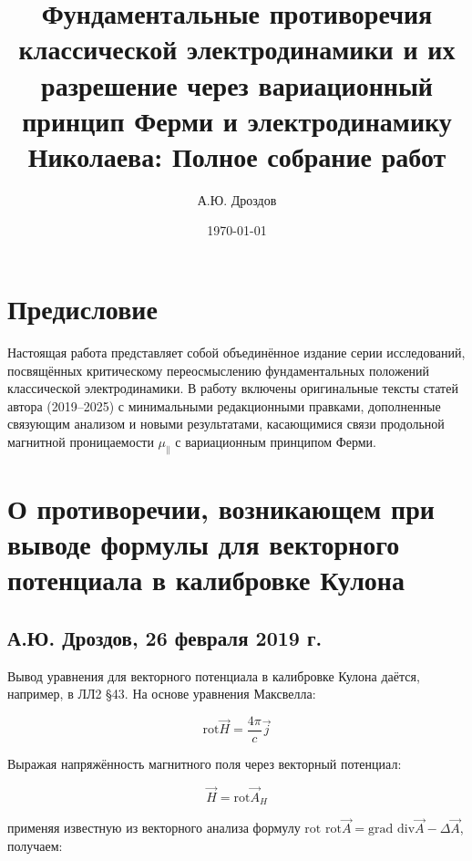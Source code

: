 \documentclass[12pt, a4paper]{article}
\title{Фундаментальные противоречия классической электродинамики и их разрешение через вариационный принцип Ферми и электродинамику Николаева: Полное собрание работ}
\author{А.Ю. Дроздов}
\date{\today}
\begin{document}
\maketitle

\tableofcontents
\newpage

\section*{Предисловие}

Настоящая работа представляет собой объединённое издание серии исследований, посвящённых критическому переосмыслению фундаментальных положений классической электродинамики. В работу включены оригинальные тексты статей автора (2019--2025) с минимальными редакционными правками, дополненные связующим анализом и новыми результатами, касающимися связи продольной магнитной проницаемости $\mu_{\parallel}$ с вариационным принципом Ферми.

\newpage

\section{О противоречии, возникающем при выводе формулы для векторного потенциала в калибровке Кулона}
\label{sec:work01}

\subsection*{А.Ю. Дроздов, 26 февраля 2019 г.}

Вывод уравнения для векторного потенциала в калибровке Кулона даётся, например, в ЛЛ2 §43. На основе уравнения Максвелла:

\begin{equation}
\text{rot} \vec{H} = \frac{4\pi}{c} \vec{j}
\label{eq:maxwell_rot}
\end{equation}

Выражая напряжённость магнитного поля через векторный потенциал:

\begin{equation}
\vec{H} = \text{rot} \vec{A}_H
\label{eq:H_via_A}
\end{equation}

применяя известную из векторного анализа формулу $\text{rot rot} \vec{A} = \text{grad div} \vec{A} - \Delta \vec{A}$, получаем:
\end{document}
